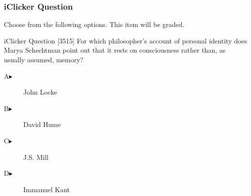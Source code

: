 \begin{frame}
  \frametitle{iClicker Question}
Choose from the following options. This item will be graded.
\begin{block}{iClicker Question}
[3515] For which philosopher's account of personal identity does Marya
Schechtman point out that it rests on consciousness rather than, as
usually assumed, memory?
\end{block}
\begin{description}
\item[A\hspace{.2in}$\blacktriangleright$] John Locke
\item[B\hspace{.2in}$\blacktriangleright$] David Hume
\item[C\hspace{.2in}$\blacktriangleright$] J.S. Mill
\item[D\hspace{.2in}$\blacktriangleright$] Immanuel Kant
\end{description}
\end{frame}

